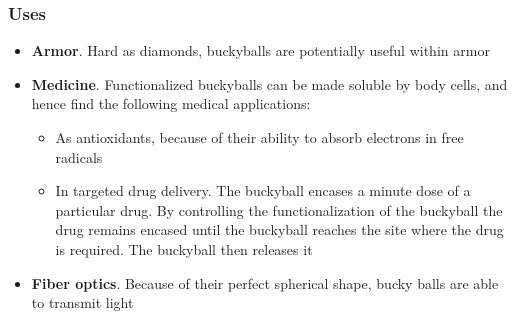 \documentclass{beamer}
\begin{document}
\begin{frame}
	\frametitle{Uses}
	\begin{itemize}
		\item \textbf{Armor}. Hard as diamonds, buckyballs are potentially useful within armor
		
		\item \textbf{Medicine}. Functionalized buckyballs can be made soluble by body cells, and hence find the following medical applications:
			\begin{itemize}
				\item As antioxidants, because of their ability to absorb electrons in free radicals
				
				\item In targeted drug delivery. The buckyball encases a minute dose of a particular drug. By controlling the functionalization of the buckyball the drug remains encased until the buckyball reaches the site where the drug is required. The buckyball then releases it
			\end{itemize}
		\item \textbf{Fiber optics}. Because of their perfect spherical shape, bucky balls are able to transmit light

	\end{itemize}
\end{frame}
\end{document}
